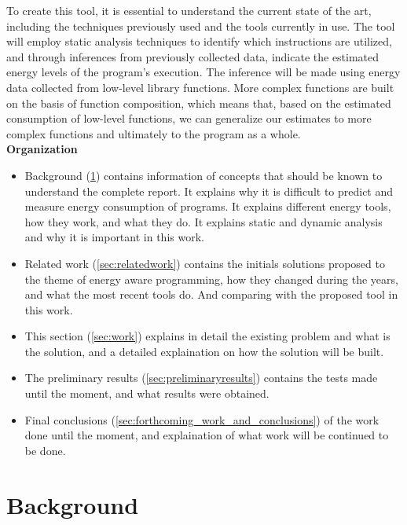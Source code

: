\documentclass[sigplan]{acmart}
\begin{document}
To create this tool, it is essential to understand the current state of the art, including the techniques previously used and the tools currently in use. The tool will employ static analysis techniques to identify which instructions are utilized, and through inferences from previously collected data, indicate the estimated energy levels of the program's execution. The inference will be made using energy data collected from low-level library functions. More complex functions are built on the basis of function composition, which means that, based on the estimated consumption of low-level functions, we can generalize our estimates to more complex functions and ultimately to the program as a whole. \\

\textbf{Organization} 

\begin{itemize}

\item Background (\ref{sec:background}) contains information of concepts that should be known to understand the complete report. It explains why it is difficult to predict and measure energy consumption of programs. It explains different energy tools, how they work, and what they do. It explains static and dynamic analysis and why it is important in this work.

\item Related work (\ref{sec:relatedwork}) contains the initials solutions proposed to the theme of energy aware programming, how they changed during the years, and what the most recent tools do. And comparing with the proposed tool in this work.

\item This section (\ref{sec:work}) explains in detail the existing problem and what is the solution, and a detailed explaination on how the solution will be built.

\item The preliminary results (\ref{sec:preliminaryresults}) contains the tests made until the moment, and what results were obtained.

\item  Final conclusions (\ref{sec:forthcoming_work_and_conclusions}) of the work done until the moment, and explaination of what work will be continued to be done.\\
\end{itemize}

\section{Background} \label{sec:background}
\end{document}
